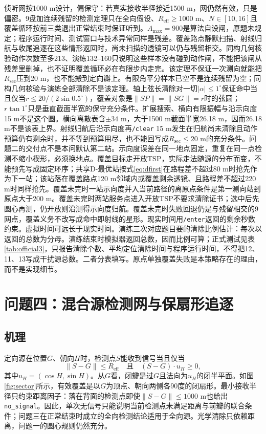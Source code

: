 \documentclass{cumcmthesis}
\begin{document}
侦听网按1000 m设计，偏保守：若真实接收半径接近1500 m，网仍然有效，只是偏密。9盘加连续残留的检测定理只在全向假设、$R_{\mathrm{eff}}\ge 1000$ m、$N\in[10,16]$且覆盖循环按前三类退出正常结束时保证听到。$A_{\max}=900$是算法自设闸，原题未规定；程序运行时间、测试窗口与技术异常同样是残差。覆盖路点静默扫描、射线归航与收尾追逐在这些情形返回时，尚未扫描的透镜可以仍与残留相交。同构几何核验动作次数至多213、演练132--160只说明这些样本没有碰到动作闸，不能把该闸从残差里删掉，也不证明覆盖循环必在有限步内走完。该定理不保证一次测向就能把$R_{\mathrm{sec}}$压到20 m，也不能搬到定向瓣上。有限角平分样本已空不是连续残留为空；同构几何核验与演练全部清除不是该定理。轴上弦长清除对一切$|\alpha|\le 1^\circ$保证命中当且仅当$r\le 20/(2\sin 0.5^\circ)$，覆盖对象是$\|SP\|=\|SG\|=r$时的弦圆；$r\tan 1^\circ$只是垂直截面半宽的保守充分条件。扩展搜索、横向有限振幅与沿示向度15 m不是这个圆。横向离散表含$\pm 34$ m，大于1500 m截面半宽26.18 m，因而26.18 m不是该表上界。射线归航后沿示向度再\texttt{/clear} 15 m发生在归航尚未清除且动作预算仍有剩余时，并不等到预算用尽，也不能回写成$R_{\mathrm{sec}}\le 20$ m的充分条件。问题二的交付点不是本问默认第二站。示向度误差在同一地点固定，重复在同一点检测不缩小楔形，必须换地点。覆盖目标走开放TSP，实际走法随源的分布而变，不能预先写成固定环序；共享D-最优站按式\eqref{eq:dfirst}在路程差不超过80 m时抢先作为下一站；该站落在覆盖路点120 m邻域内或覆盖剩余透镜、且路程差不超过220 m时同样抢先。覆盖未完时一站示向度并入当前路径的离原点条件是第一测向站到原点大于200 m。覆盖未完时两站服务点进入开放TSP不要求清除证书；选中后先圆心再测，仍开放则沿测得示向度归航。覆盖未完时失败回退仍是与残留相交的9网点，覆盖义务不改写成命中即射线的星形。现实时间用\texttt{/enter}返回的剩余秒数约束。虚拟时间可远长于现实时间。演练三次对应题目要的清除比例估计：每次以返回的总数为分母。演练结束时模拟器返回总数，因而比例可算；正式测试见表\ref{tab:official3}，只报告清除个数、平均定位清除时间与程序运行时间，不得把12、11、13写成干扰源总数。二者分表填写。原点单独覆盖失败是本策略存在的理由，而不是实现细节。

\section{问题四：混合源检测网与保扇形追逐}

\subsection{机理}

定向源在位置$G$、朝向$H$时，检测点$S$能收到信号当且仅当
\begin{equation}
\|S-G\|\le R_{\mathrm{eff}}\quad\text{且}\quad (S-G)\cdot u_H\ge 0,
\label{eq:dir}
\end{equation}
其中$u_H=(\cos H,\sin H)$。从$G$看，闭瓣是过$G$且法向为$u_H$的闭半平面。如图\ref{fig:sector}所示，有效覆盖是以$G$为顶点、朝向两侧各90度的闭扇形。最小接收半径只约束距离因子：落在背面的检测点即使$\|S-G\|\le 1000$ m也给出\texttt{no\_signal}。因此，单次无信号只能说明当前检测点未满足距离与前瓣的联合条件；问题三在正常结束时成立的全向检测结论适用于全向源。光学清除只依赖距离，问题一的圆心规则仍然充分。
\end{document}
